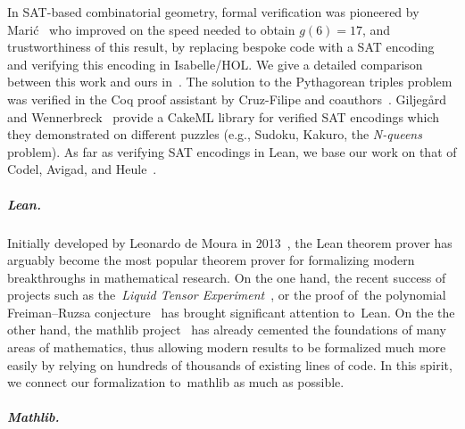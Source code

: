 In SAT-based combinatorial geometry,
formal verification was pioneered by Marić~\cite{19maric_fast_formal_proof_erdos_szekeres_conjecture_convex_polygons_most_six_points}
who improved on the speed needed to obtain $g(6) = 17$,
and trustworthiness of this result,
by replacing bespoke code with a SAT encoding
and verifying this encoding in \textsf{Isabelle/HOL}.
We give a detailed comparison between this work and ours in~.
The solution to the Pythagorean triples problem
was verified in the \textsf{Coq} proof assistant
by Cruz-Filipe and coauthors~\cite{formalPythagoreanTriples,LPAR-21:Formally_Proving_Boolean_Pythagorean}.
Giljeg\r{a}rd and Wennerbreck~\cite{GilAndWennerbeck} provide a \textsf{CakeML} library
for verified SAT encodings
which they demonstrated on different puzzles
(e.g., Sudoku, Kakuro, the \emph{N-queens} problem).
As far as verifying SAT encodings in Lean,
we base our work on that of Codel, Avigad, and Heule~\cite{Cayden}.

\subparagraph*{Lean.}
Initially developed by Leonardo de Moura in 2013~\cite{demouraLeanTheoremProver2015}, the Lean theorem prover has arguably become the most popular theorem prover for formalizing modern breakthroughs in mathematical research.
On the one hand, the recent success of projects such as the~\emph{Liquid Tensor Experiment}~\cite{Castelvecchi2021}, or the proof of~the polynomial Freiman–Ruzsa conjecture~\cite{gowers2023conjecture, slomanATeamMathProves2023} has brought significant attention to~Lean. %
On the the other hand, the \textsf{mathlib} project~\cite{The_mathlib_Community_2020} has already cemented the foundations of many areas of mathematics, thus allowing modern results to be formalized much more easily by relying on hundreds of thousands of existing lines of code. In this spirit, we connect our formalization to~\textsf{mathlib} as much as possible.

\subparagraph*{Mathlib.}

